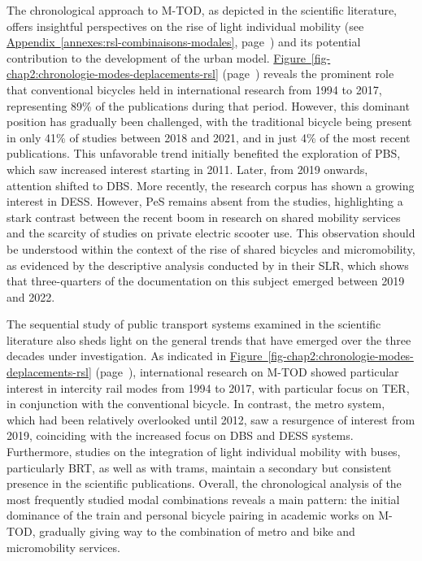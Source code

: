 \begin{refsegment}
The chronological approach to \acrshort{M-TOD}, as depicted in the scientific literature, offers insightful perspectives on the rise of light individual mobility (see \hyperref[annexes:rsl-combinaisons-modales]{Appendix~\ref{annexes:rsl-combinaisons-modales}}, page~\pageref{annexes:rsl-combinaisons-modales}) and its potential contribution to the development of the urban model. \hyperref[fig-chap2:chronologie-modes-deplacements-rsl]{Figure~\ref{fig-chap2:chronologie-modes-deplacements-rsl}} (page~\pageref{fig-chap2:chronologie-modes-deplacements-rsl}) reveals the prominent role that conventional bicycles held in international research from 1994 to 2017, representing 89\% of the publications during that period. However, this dominant position has gradually been challenged, with the traditional bicycle being present in only 41\% of studies between 2018 and 2021, and in just 4\% of the most recent publications. This unfavorable trend initially benefited the exploration of \acrfull{PBS}, which saw increased interest starting in 2011. Later, from 2019 onwards, attention shifted to \acrfull{DBS}. More recently, the research corpus has shown a growing interest in \acrfull{DESS}. However, \acrfull{PeS} remains absent from the studies, highlighting a stark contrast between the recent boom in research on shared mobility services and the scarcity of studies on private electric scooter use. This observation should be understood within the context of the rise of shared bicycles and micromobility, as evidenced by the descriptive analysis conducted by \textcolor{blue}{\textcite[298]{zhang_built_2023}} in their \acrshort{SLR}, which shows that three-quarters of the documentation on this subject emerged between 2019 and 2022.%

The sequential study of public transport systems examined in the scientific literature also sheds light on the general trends that have emerged over the three decades under investigation. As indicated in \hyperref[fig-chap2:chronologie-modes-deplacements-rsl]{Figure~\ref{fig-chap2:chronologie-modes-deplacements-rsl}} (page~\pageref{fig-chap2:chronologie-modes-deplacements-rsl}), international research on \acrshort{M-TOD} showed particular interest in intercity rail modes from 1994 to 2017, with particular focus on \acrfull{TER}, in conjunction with the conventional bicycle. In contrast, the metro system, which had been relatively overlooked until 2012, saw a resurgence of interest from 2019, coinciding with the increased focus on \acrshort{DBS} and \acrshort{DESS} systems. Furthermore, studies on the integration of light individual mobility with buses, particularly \acrfull{BRT}, as well as with trams, maintain a secondary but consistent presence in the scientific publications. Overall, the chronological analysis of the most frequently studied modal combinations reveals a main pattern: the initial dominance of the train and personal bicycle pairing in academic works on \acrshort{M-TOD}, gradually giving way to the combination of metro and bike and micromobility services.%


\end{refsegment}
